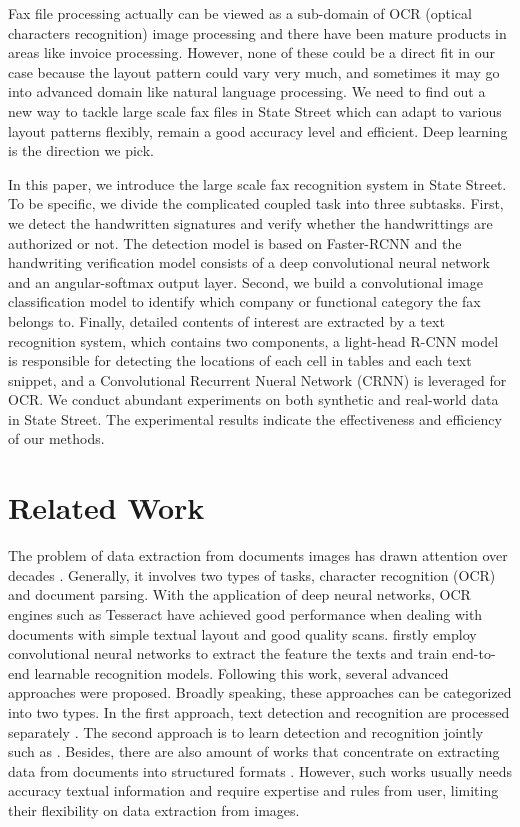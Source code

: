 \documentclass[sigconf]{acmart}
\begin{document}
Fax file processing actually can be viewed as a sub-domain of OCR (optical characters recognition) image processing and there have been mature products in areas like invoice processing. However, none of these could be a direct fit in our case because the layout pattern could vary very much, and sometimes it may go into advanced domain like natural language processing. We need to find out a new way to tackle large scale fax files in State Street which can adapt to various layout patterns flexibly, remain a good accuracy level and efficient. Deep learning is the direction we pick.

In this paper, we introduce the large scale fax recognition system in State Street. To be specific, we divide the complicated coupled task into three subtasks. First, we detect the handwritten signatures and verify whether the handwrittings are authorized or not. The detection model is based on Faster-RCNN and the handwriting verification model consists of a deep convolutional neural network and an angular-softmax output layer. Second, we build a convolutional image classification model to identify which company or functional category the fax belongs to. Finally, detailed contents of interest are extracted by a text recognition system, which contains two components, a light-head R-CNN model is responsible for detecting the locations of each cell in tables and each text snippet, and a Convolutional Recurrent Nueral Network (CRNN) is leveraged for OCR. We conduct abundant experiments on both synthetic and real-world data in State Street. The experimental results indicate the effectiveness and efficiency of our methods.


\section{Related Work}
The problem of data extraction from documents images has drawn attention over decades \cite{nagy2000twenty}. Generally, it involves two types of tasks, character recognition (OCR) and document parsing. With the application of deep neural networks, OCR engines such as Tesseract \cite{smith2007overview} have achieved good performance when dealing with documents with simple textual layout and good quality scans. \citet{jaderberg2014synthetic} firstly employ convolutional neural networks to extract the feature the texts and train end-to-end learnable recognition models. Following this work, several advanced approaches were proposed. Broadly speaking, these approaches can be categorized into two types. In the first approach, text detection and recognition are processed separately \cite{shi2017end, tian2016detecting, he2017deep, lyu2018multi, borisyuk2018rosetta}. The second approach is to learn detection and recognition jointly such as \cite{li2017towards, buvsta2017deep, liu2018fots}. Besides, there are also amount of works that concentrate on extracting data from documents into structured formats \cite{cesarini1998informys, chanod2005legacy, peanho2012semantic, li2016precomputed}. However, such works usually needs accuracy textual information and require expertise and rules from user, limiting their flexibility on data extraction from images.
\end{document}
